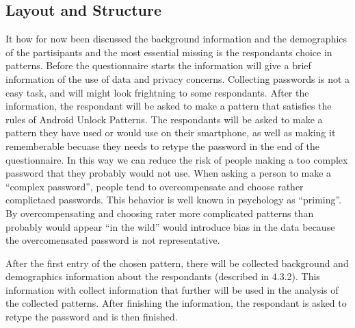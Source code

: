 
  
  \clearpage
  \subsection{Layout and Structure}

    It how for now been discussed the background information and the demographics of the partisipants and the most essential missing is the respondants choice in patterns. Before the questionnaire starts the information will give a brief information of the use of data and privacy concerns. Collecting passwords is not a easy task, and will might look frightning to some respondants. After the information, the respondant will be asked to make a pattern that satisfies the rules of Android Unlock Patterns. The respondants will be asked to make a pattern they have used or would use on their smartphone, as well as making it rememberable becuase they needs to retype the password in the end of the questionnaire. In this way we can reduce the risk of people making a too complex password that they probably would not use. When asking a person to make a ``complex password'', people tend to overcompensate and choose rather complictaed passwords. This behavior is well known in psychology as ``priming''. By overcompensating and choosing rater more complicated patterns than probably would appear ``in the wild'' would introduce bias in the data because the overcomensated password is not representative. 

    After the first entry of the chosen pattern, there will be collected background and demographics information about the respondants (described in 4.3.2). This information with collect information that further will be used in the analysis of the collected patterns. After finishing the information, the respondant is asked to retype the password and is then finished.     

